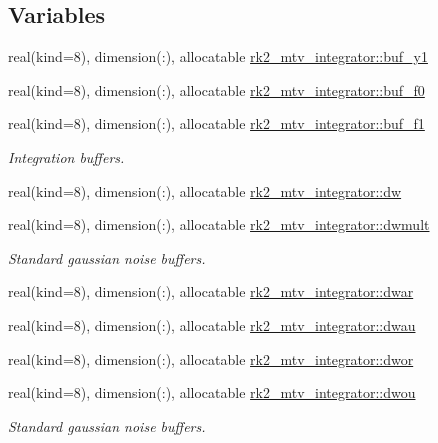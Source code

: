 \subsection*{Variables}
\begin{DoxyCompactItemize}
\item 
real(kind=8), dimension(\+:), allocatable \hyperlink{namespacerk2__mtv__integrator_aa33cc6702537576ce9327c8c1bacc0e0}{rk2\+\_\+mtv\+\_\+integrator\+::buf\+\_\+y1}
\item 
real(kind=8), dimension(\+:), allocatable \hyperlink{namespacerk2__mtv__integrator_a8a81a8ea6d873549ea3fab2c25ab8f56}{rk2\+\_\+mtv\+\_\+integrator\+::buf\+\_\+f0}
\item 
real(kind=8), dimension(\+:), allocatable \hyperlink{namespacerk2__mtv__integrator_a082b2bb51352639e114015017d7e8a8c}{rk2\+\_\+mtv\+\_\+integrator\+::buf\+\_\+f1}
\begin{DoxyCompactList}\small\item\em Integration buffers. \end{DoxyCompactList}\item 
real(kind=8), dimension(\+:), allocatable \hyperlink{namespacerk2__mtv__integrator_acfc8cafd615b189ed69fe547c21a523d}{rk2\+\_\+mtv\+\_\+integrator\+::dw}
\item 
real(kind=8), dimension(\+:), allocatable \hyperlink{namespacerk2__mtv__integrator_a00366eb109bd6df9f42317a1103b42d7}{rk2\+\_\+mtv\+\_\+integrator\+::dwmult}
\begin{DoxyCompactList}\small\item\em Standard gaussian noise buffers. \end{DoxyCompactList}\item 
real(kind=8), dimension(\+:), allocatable \hyperlink{namespacerk2__mtv__integrator_a943f1c40aae9be23e299c05b361c7ce5}{rk2\+\_\+mtv\+\_\+integrator\+::dwar}
\item 
real(kind=8), dimension(\+:), allocatable \hyperlink{namespacerk2__mtv__integrator_a00726f064d00787a9f02d960defbcf71}{rk2\+\_\+mtv\+\_\+integrator\+::dwau}
\item 
real(kind=8), dimension(\+:), allocatable \hyperlink{namespacerk2__mtv__integrator_a1d35c3699f7164073c6c616117541e1c}{rk2\+\_\+mtv\+\_\+integrator\+::dwor}
\item 
real(kind=8), dimension(\+:), allocatable \hyperlink{namespacerk2__mtv__integrator_af1862c97e660a0a557657dccbdc02fa8}{rk2\+\_\+mtv\+\_\+integrator\+::dwou}
\begin{DoxyCompactList}\small\item\em Standard gaussian noise buffers. \end{DoxyCompactList}\item 

\end{DoxyCompactItemize}
